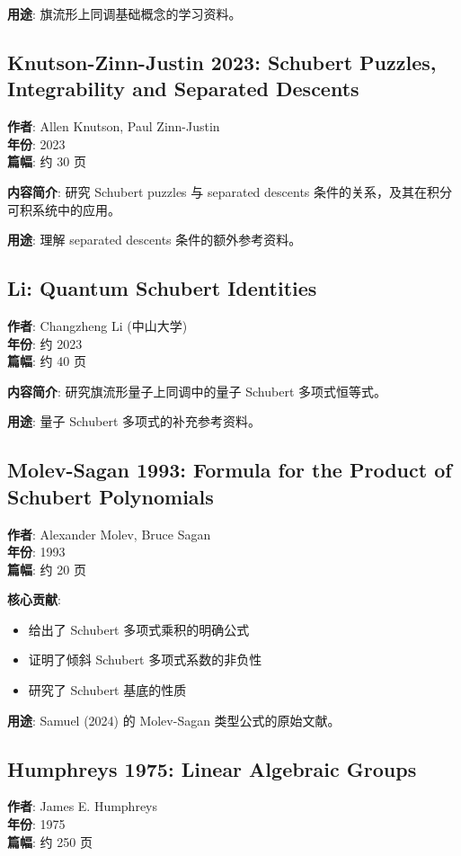 \textbf{用途}: 旗流形上同调基础概念的学习资料。

\subsection{Knutson-Zinn-Justin 2023: Schubert Puzzles, Integrability and Separated Descents}
\textbf{作者}: Allen Knutson, Paul Zinn-Justin \\
\textbf{年份}: 2023 \\
\textbf{篇幅}: 约 30 页

\textbf{内容简介}: 研究 Schubert puzzles 与 separated descents 条件的关系，及其在积分可积系统中的应用。

\textbf{用途}: 理解 separated descents 条件的额外参考资料。

\subsection{Li: Quantum Schubert Identities}
\textbf{作者}: Changzheng Li (中山大学) \\
\textbf{年份}: 约 2023 \\
\textbf{篇幅}: 约 40 页

\textbf{内容简介}: 研究旗流形量子上同调中的量子 Schubert 多项式恒等式。

\textbf{用途}: 量子 Schubert 多项式的补充参考资料。

\subsection{Molev-Sagan 1993: Formula for the Product of Schubert Polynomials}
\textbf{作者}: Alexander Molev, Bruce Sagan \\
\textbf{年份}: 1993 \\
\textbf{篇幅}: 约 20 页

\textbf{核心贡献}:
\begin{itemize}
\item 给出了 Schubert 多项式乘积的明确公式
\item 证明了倾斜 Schubert 多项式系数的非负性
\item 研究了 Schubert 基底的性质
\end{itemize}

\textbf{用途}: Samuel (2024) 的 Molev-Sagan 类型公式的原始文献。

\subsection{Humphreys 1975: Linear Algebraic Groups}
\textbf{作者}: James E. Humphreys \\
\textbf{年份}: 1975 \\
\textbf{篇幅}: 约 250 页

